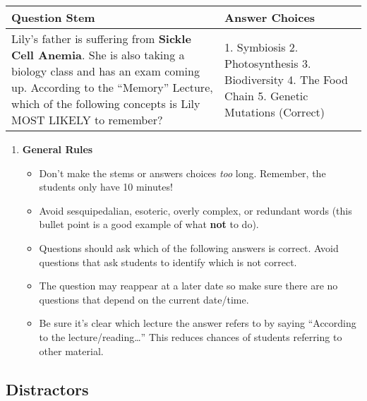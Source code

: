 \documentclass[
]{article}
\providecommand{\tightlist}{%
  \setlength{\itemsep}{0pt}\setlength{\parskip}{0pt}}
\begin{document}
\begin{longtable}[]{@{}ll@{}}
\toprule
\begin{minipage}[b]{0.30\columnwidth}\raggedright
\textbf{Question Stem}\strut
\end{minipage} & \begin{minipage}[b]{0.64\columnwidth}\raggedright
\textbf{Answer Choices}\strut
\end{minipage}\tabularnewline
\midrule
\endhead
\begin{minipage}[t]{0.30\columnwidth}\raggedright
Lily's father is suffering from \textbf{Sickle Cell Anemia}. She is also taking a biology class and has an exam coming up. According to the ``Memory'' Lecture, which of the following concepts is Lily MOST LIKELY to remember?\strut
\end{minipage} & \begin{minipage}[t]{0.64\columnwidth}\raggedright
1. Symbiosis 2. Photosynthesis 3. Biodiversity 4. The Food Chain 5. Genetic Mutations (Correct)\strut
\end{minipage}\tabularnewline
\bottomrule
\end{longtable}

\begin{enumerate}
\def\labelenumi{\arabic{enumi}.}
\setcounter{enumi}{5}
\tightlist
\item
  \textbf{General Rules}

  \begin{itemize}
  \tightlist
  \item
    Don't make the stems or answers choices \emph{too} long. Remember, the students only have 10 minutes!
  \item
    Avoid sesquipedalian, esoteric, overly complex, or redundant words (this bullet point is a good example of what \textbf{not} to do).
  \item
    Questions should ask which of the following answers is correct. Avoid questions that ask students to identify which is not correct.
  \item
    The question may reappear at a later date so make sure there are no questions that depend on the current date/time.
  \item
    Be sure it's clear which lecture the answer refers to by saying ``According to the lecture/reading\ldots{}'' This reduces chances of students referring to other material.
  \end{itemize}
\end{enumerate}

\hypertarget{distractors}{%
\subsection{Distractors}\label{distractors}}
\end{document}

